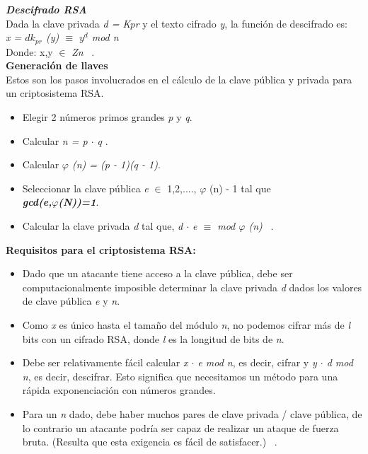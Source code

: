 \textbf{\textit{Descifrado RSA}} \\Dada la clave privada \textit{d = Kpr} y el texto cifrado \textit{y}, la función de descifrado es:
\\
\textit{ x = $dk_{pr}$ (y) $\equiv$ $y^{d}$ mod n }\\
Donde:  x,y $\in$ \textit{Zn} ~\cite{paar}. \\


 \textbf{Generación de llaves} \\
Estos son los pasos involucrados en el cálculo de la clave pública y privada para un criptosistema RSA.
\begin{itemize}

	\item Elegir 2 números primos grandes \textit{p} y \textit{q}.
	\item Calcular \textit{n = p $\cdot$ q }.
	\item Calcular \textit{$\varphi$ (n) = (p - 1)(q - 1)}.
	\item Seleccionar la clave pública \textit{e} $\in$ {1,2,...., $\varphi$ (n) - 1} tal que \\ \textbf{\textit{gcd(e,$\varphi$(N))=1}}.
	\item Calcular la clave privada \textit{d} tal que, \textit{d $\cdot$ e $\equiv$ mod $\varphi$ (n)} ~\cite{paar}. \\
\end{itemize} 


\textbf{Requisitos para el criptosistema RSA:}
\begin{itemize}
	\item Dado que un atacante tiene acceso a la clave pública, debe ser computacionalmente imposible determinar la clave privada  \textit{d} dados los valores de clave pública  \textit{e} y  \textit{n}.
	\item Como  \textit{x} es único hasta el tamaño del módulo  \textit{n}, no podemos cifrar más de  \textit{l} bits con un cifrado RSA, donde  \textit{l} es la longitud de bits de  \textit{n}.
	\item Debe ser relativamente fácil calcular  \textit{x $\cdot$ e mod n}, es decir, cifrar y  \textit{y $\cdot$ d mod n}, es decir, descifrar. Esto significa que necesitamos un método para una rápida exponenciación con números grandes.
	\item Para un \textit{n} dado, debe haber muchos pares de clave privada / clave pública, de lo contrario un atacante podría ser capaz de realizar un ataque de fuerza bruta. (Resulta que esta exigencia es fácil de satisfacer.) ~\cite{paar}.
\end{itemize}

